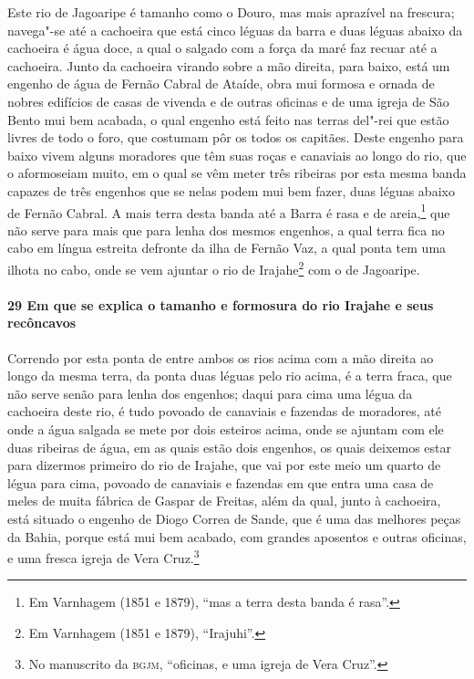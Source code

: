 Este rio de Jagoaripe é tamanho como o Douro, mas mais aprazível na frescura; navega"-se
até a cachoeira que está cinco léguas da barra e duas léguas abaixo da cachoeira é água
doce, a qual o salgado com a força da maré faz recuar até a cachoeira. Junto da cachoeira
virando sobre a mão direita, para baixo, está um engenho de água de Fernão Cabral de
Ataíde, obra mui formosa e ornada de nobres edifícios de casas de vivenda e de outras
oficinas e de uma igreja de São Bento mui bem acabada, o qual engenho está feito nas
terras del"-rei que estão livres de todo o foro, que costumam pôr os todos os capitães.
Deste engenho para baixo vivem alguns
moradores que têm suas roças e canaviais ao longo do rio, que o aformoseiam muito, em o
qual se vêm meter três ribeiras por esta mesma banda capazes de três engenhos que se nelas
podem mui bem fazer, duas léguas abaixo de Fernão Cabral. A mais terra desta banda até a
Barra é rasa e de areia,\footnote{ Em Varnhagem (1851 e 1879), ``mas a terra desta banda é
rasa''.} que não serve para mais que para lenha dos mesmos engenhos, a qual terra fica no
cabo em língua estreita defronte da ilha de Fernão Vaz, a qual ponta tem uma ilhota no
cabo, onde se vem ajuntar o rio de Irajahe\footnote{ Em Varnhagem (1851 e 1879),
``Irajuhi''.} com o de Jagoaripe.

\paragraph{29 Em que se explica o tamanho e formosura do rio Irajahe e seus recôncavos}

Correndo por esta ponta de entre ambos os rios acima com a mão direita ao longo da mesma
terra, da ponta duas léguas pelo rio acima, é a terra fraca, que não serve senão para
lenha dos engenhos; daqui para cima uma légua da cachoeira deste rio, é tudo povoado de
canaviais e fazendas de moradores, até onde a água salgada se mete por dois esteiros
acima, onde se ajuntam com ele duas ribeiras de água, em as quais estão dois engenhos, os
quais deixemos estar para dizermos primeiro do rio de Irajahe, que vai por este meio um
quarto de légua para cima, povoado de canaviais e fazendas em que entra uma casa de meles
de muita fábrica de Gaspar de Freitas, além da qual, junto à cachoeira, está situado o
engenho de Diogo Correa de Sande, que é uma das melhores peças da Bahia, porque está mui
bem acabado, com grandes aposentos e outras oficinas, e uma fresca igreja de Vera
Cruz.\footnote{ No manuscrito da \textsc{bgjm}, ``oficinas, e uma igreja de Vera Cruz''.}

